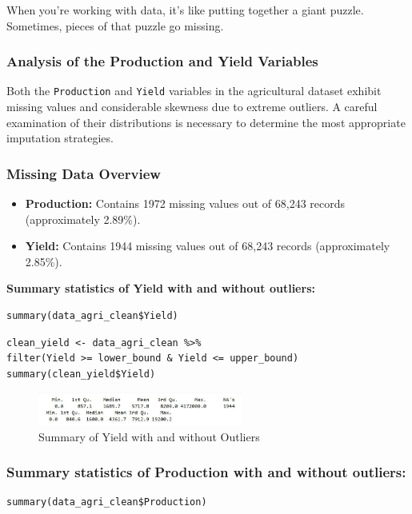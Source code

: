 When you’re working with data, it’s like putting together a giant puzzle. Sometimes, pieces of that puzzle go missing.

\subsubsection*{Analysis of the Production and Yield Variables}
Both the \texttt{Production} and \texttt{Yield} variables in the agricultural dataset exhibit missing values and considerable skewness due to extreme outliers. A careful examination of their distributions is necessary to determine the most appropriate imputation strategies.

\subsubsection*{Missing Data Overview}
\begin{itemize}
    \item \textbf{Production:} Contains 1972 missing values out of 68,243 records (approximately 2.89\%).
    \item \textbf{Yield:} Contains 1944 missing values out of 68,243 records (approximately 2.85\%).
\end{itemize}

\textbf{Summary statistics of Yield with and without outliers:}
\begin{verbatim}
summary(data_agri_clean$Yield)
\end{verbatim}
\begin{verbatim}
clean_yield <- data_agri_clean %>% 
filter(Yield >= lower_bound & Yield <= upper_bound)
summary(clean_yield$Yield)
\end{verbatim}

\begin{figure}[h]
\centering
\includegraphics[width=0.6\textwidth]{figures/summary_yield.jpg}
\caption{Summary of Yield with and without Outliers}
\end{figure}

\subsubsection*{Summary statistics of Production with and without outliers:}
\begin{verbatim}
summary(data_agri_clean$Production)
\end{verbatim}

